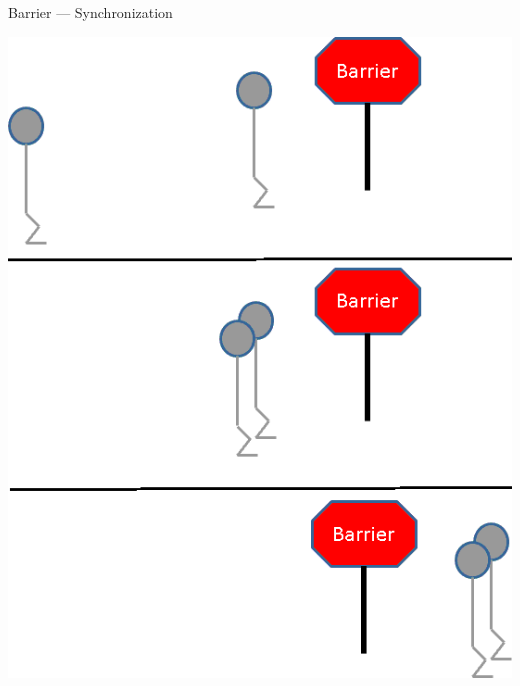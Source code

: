 \begin{frame}
  \begin{block}{Barrier --- Synchronization}
    \begin{center}
      \includegraphics[scale=.38]{../common/pics/mpiops/mpi_barrier}
    \end{center}
  \end{block}
\end{frame}



